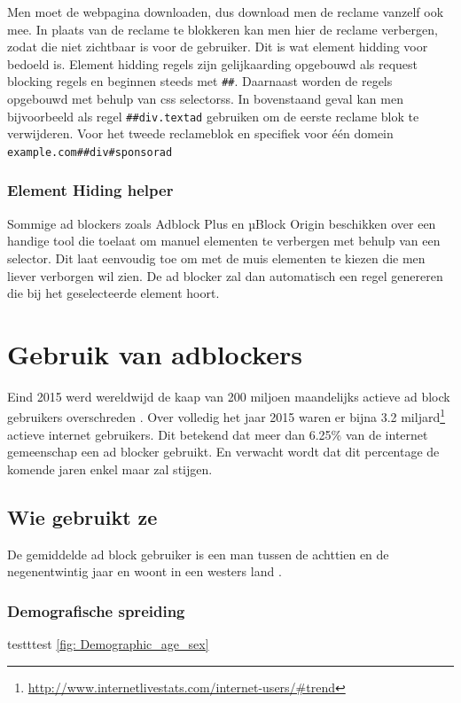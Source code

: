 \documentclass[pdftex,a4paper,12pt,twoside]{report}
\begin{document}
Men moet de webpagina downloaden, dus download men de reclame vanzelf ook mee. In plaats van de reclame te blokkeren kan men hier de reclame verbergen, zodat die niet zichtbaar is voor de gebruiker. Dit is wat element hidding voor bedoeld is. Element hidding regels zijn gelijkaarding opgebouwd als request blocking regels en beginnen steeds met \texttt{\#\#}. Daarnaast worden de regels opgebouwd met behulp van \glspl{css selectors}. In bovenstaand geval kan men bijvoorbeeld als regel \texttt{\#\#div.textad} gebruiken om de eerste reclame blok te verwijderen. Voor het tweede reclameblok en specifiek voor één domein \texttt{example.com\#\#div\#sponsorad}

\subsection{Element Hiding helper}
\label{sec Element Hiding helper} 
Sommige ad blockers zoals Adblock Plus en µBlock Origin beschikken over een handige tool die toelaat om manuel elementen te verbergen met behulp van een selector. Dit laat eenvoudig toe om met de muis elementen te kiezen die men liever verborgen wil zien. De ad blocker zal dan automatisch een regel genereren die bij het geselecteerde element hoort.

\chapter{Gebruik van adblockers}
\label{ch:Gebruik van adblockers}
Eind 2015 werd wereldwijd de kaap van 200 miljoen maandelijks actieve ad block gebruikers overschreden \citep{PageFair2015}. Over volledig het jaar 2015 waren er bijna 3.2 miljard\footnote{\url{ http://www.internetlivestats.com/internet-users/\#trend}} actieve internet gebruikers. Dit betekend dat meer dan 6.25\% van de internet gemeenschap een ad blocker gebruikt. En verwacht wordt dat dit percentage de komende jaren enkel maar zal stijgen.

\section{Wie gebruikt ze}
\label{sec:Wie gebruikt ze}
De gemiddelde ad block gebruiker is een man tussen de achttien en de negenentwintig jaar en woont in een westers land \citep{PageFair2014}.
\subsection{Demografische spreiding}
\label{sec Demografische spreiding}
testttest \ref{fig: Demographic_age_sex}
\end{document}
